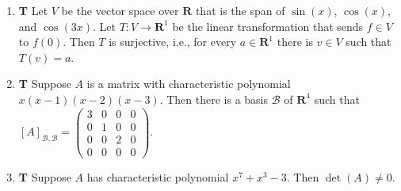 \documentclass[10pt]{article}
\newcommand{\tf}[2]{\item {\bf {\color{blue}\hspace{1em}#1}}\hspace{1em} #2}
\newcommand{\R}{\mathbf{R}}
\begin{document}
\begin{enumerate}
\tf{T}{Let $V$ be the vector space over $\R$ that is the span of $\sin(x)$, $\cos(x)$, and $\cos(3x)$.
Let $T:V\to \R^1$ be the linear transformation that sends $f\in V$ to $f(0)$.
Then $T$ is surjective, i.e., for every $a\in \R^1$ there is $v\in V$ such that $T(v)=a$.}

\tf{T}{Suppose $A$ is a matrix with characteristic polynomial $x(x-1)(x-2)(x-3)$. Then
there is a basis $\mathcal{B}$ of $\R^4$ such that
$[A]_{\mathcal{B},\mathcal{B}} = \left(\begin{array}{rrrr}
3 & 0 & 0 & 0 \\
0 & 1 & 0 & 0 \\
0 & 0 & 2 & 0 \\
0 & 0 & 0 & 0
\end{array}\right).$}

\tf{T}{Suppose $A$ has characteristic polynomial $x^{7} + x^3 - 3$.  Then $\det(A)\neq 0$.}

\end{enumerate}
\end{document}
